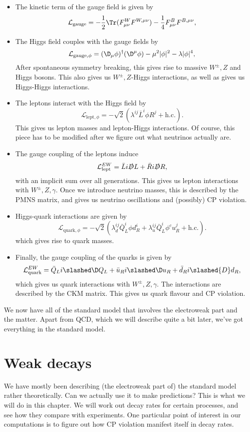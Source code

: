 \documentclass[a4paper]{article}
\begin{document}
\begin{itemize}
  \item The kinetic term of the gauge field is given by
    \[
      \mathcal{L}_{\mathrm{gauge}} = -\frac{1}{2} \Tr (F^W_{\mu\nu} F^{W,\mu\nu}) - \frac{1}{4} F_{\mu\nu}^B F^{B, \mu\nu},
    \]
  \item The Higgs field couples with the gauge fields by
    \[
      \mathcal{L}_{\mathrm{gauge}, \phi} = (\D_\mu \phi)^\dagger (\D^\mu \phi) - \mu^2 |\phi|^2 - \lambda |\phi|^4,
    \]
    After spontaneous symmetry breaking, this gives rise to massive $W^{\pm}, Z$ and Higgs bosons. This also gives us $W^{\pm}, Z$-Higgs interactions, as well as gives us Higgs-Higgs interactions.
  \item The leptons interact with the Higgs field by
    \[
      \mathcal{L}_{\mathrm{lept}, \phi} =- \sqrt{2} (\lambda^{ij} \bar L^i \phi R^j + \mathrm{h.c.}).
    \]
    This gives us lepton masses and lepton-Higgs interactions. Of course, this piece has to be modified after we figure out what neutrinos actually are.
  \item The gauge coupling of the leptons induce
    \[
      \mathcal{L}_{\mathrm{lept}}^{EW} = \bar L i \slashed D L + \bar R i \slashed D R,
    \]
    with an implicit sum over all generations. This gives us lepton interactions with $W^{\pm}, Z, \gamma$. Once we introduce neutrino masses, this is described by the PMNS matrix, and gives us neutrino oscillations and (possibly) CP violation.
  \item Higgs-quark interactions are given by
    \[
      \mathcal{L}_{\mathrm{quark}, \phi} = - \sqrt{2} (\lambda_d^{ij} \bar{Q}_L^i \phi d_R^i + \lambda_u^{ij} \bar{Q}_L^i \phi^c u_R^j + \mathrm{h.c.}).
    \]
    which gives rise to quark masses.
  \item Finally, the gauge coupling of the quarks is given by
    \[
      \mathcal{L}_{\mathrm{quark}}^{EW} = \bar{Q}_L i \slashed \D Q_L + \bar{u}_R i \slashed\D u_R + \bar{d}_R i \slashed{D} d_R,
    \]
    which gives us quark interactions with $W^{\pm}, Z, \gamma$. The interactions are described by the CKM matrix. This gives us quark flavour and CP violation.
\end{itemize}

We now have all of the standard model that involves the electroweak part and the matter. Apart from QCD, which we will describe quite a bit later, we've got everything in the standard model.

\section{Weak decays}
We have mostly been describing (the electroweak part of) the standard model rather theoretically. Can we actually use it to make predictions? This is what we will do in this chapter. We will work out decay rates for certain processes, and see how they compare with experiments. One particular point of interest in our computations is to figure out how CP violation manifest itself in decay rates.
\end{document}
